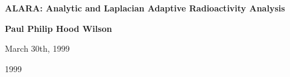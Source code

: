 \documentclass{article}
\begin{document}
\begin{center}
  
  \vspace*{0.5in}
  
  \textbf{\LARGE ALARA: Analytic and Laplacian Adaptive Radioactivity
    Analysis}
  
  
  \vspace{2.25in} 
  \textbf{\Large Paul Philip Hood Wilson}

\end{center}

\vspace{0.96in} 
\hspace{1.75in} 
\normalsize
March 30th, 1999

\vspace{.26in} 

\hspace{3.15in} 
1999
\end{document}
